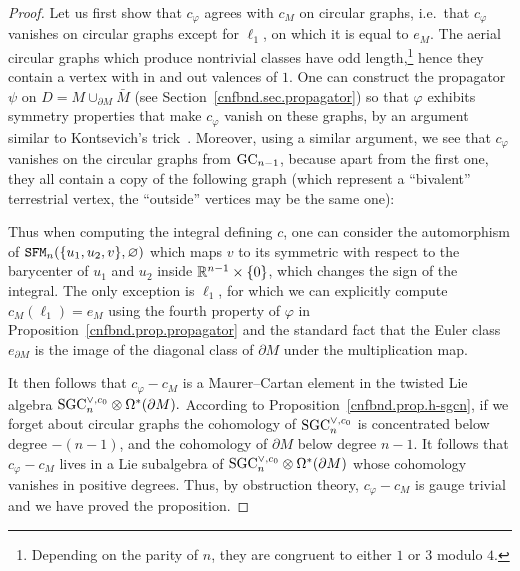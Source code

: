 \begin{proof}
  Let us first show that $c_{\varphi}$ agrees with $c_{M}$ on circular graphs, i.e.\ that $c_{\varphi}$ vanishes on circular graphs except for $\ell_1$, on which it is equal to $e_{M}$.
    The aerial circular graphs which produce nontrivial classes have odd length,\footnote{Depending on the parity of $n$, they are congruent to either $1$ or $3$ modulo $4$.} hence they contain a vertex with in and out valences of $1$.
    One can construct the propagator $\psi$ on $D = M \cup_{\partial M} \bar{M}$ (see Section~\ref{cnfbnd.sec.propagator}) so that $\varphi$ exhibits symmetry properties that make $c_{\varphi}$ vanish on these graphs, by an argument similar to Kontsevich's trick~\cite[Lemma~2.1]{Kontsevich1994}.
    Moreover, using a similar argument, we see that $c_{\varphi}$ vanishes on the circular graphs from $\mathrm{GC}_{n-1}$, because apart from the first one, they all contain a copy of the following graph (which represent a ``bivalent'' terrestrial vertex, the ``outside'' vertices may be the same one):
  \begin{center}
  \end{center}
  Thus when computing the integral defining $c$, one can consider the automorphism of $\mathtt{SFM}_{n}(\{u_{1}, u_{2}, v\}, \varnothing)$ which maps $v$ to its symmetric with respect to the barycenter of $u_{1}$ and $u_{2}$ inside $\mathbb{R}^{n-1} \times \{ 0 \}$, which changes the sign of the integral.
  The only exception is $\ell_1$, for which we can explicitly compute $c_{M}(\ell_1) = e_{M}$ using the fourth property of $\varphi$ in Proposition~\ref{cnfbnd.prop.propagator} and the standard fact that the Euler class $e_{\partial M}$ is the image of the diagonal class of $\partial M$ under the multiplication map.

  It then follows that $c_{\varphi} - c_{M}$ is a Maurer--Cartan element in the twisted Lie algebra $\mathrm{SGC}_{n}^{\vee, c_{0}} \otimes \Omega^{*}(\partial M).$
  According to Proposition~\ref{cnfbnd.prop.h-sgcn}, if we forget about circular graphs the cohomology of $\mathrm{SGC}_{n}^{\vee, c_{0}}$ is concentrated below degree $-(n-1)$, and the cohomology of $\partial M$ below degree $n-1$.
  It follows that $c_{\varphi} - c_{M}$ lives in a Lie subalgebra of $\mathrm{SGC}_{n}^{\vee, c_{0}} \otimes \Omega^{*}(\partial M)$ whose cohomology vanishes in positive degrees.
  Thus, by obstruction theory, $c_{\varphi} - c_{M}$ is gauge trivial and we have proved the proposition.
\end{proof}

